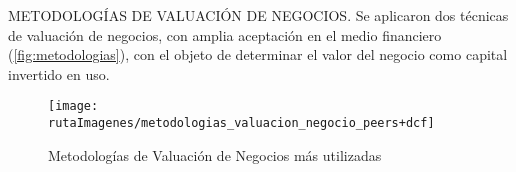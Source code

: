 \begin{rightcolumn}

\textcolor{secundario}{METODOLOG\'IAS DE VALUACI\'ON DE NEGOCIOS}. Se aplicaron dos t\'ecnicas de valuaci\'on de negocios, con amplia aceptaci\'on en el medio financiero (\autoref{fig:metodologias}), con el objeto de determinar el valor del negocio como capital invertido en uso.\\
\end{rightcolumn}

\begin{leftcolumn}
\begin{figure}[H]
\centering
\caption{Metodolog\'ias de Valuaci\'on de Negocios m\'as utilizadas\label{fig:metodologias}}
\texttt{[image: \\rutaImagenes/metodologias\_valuacion\_negocio\_peers+dcf]}\\

\end{figure}

\end{leftcolumn}